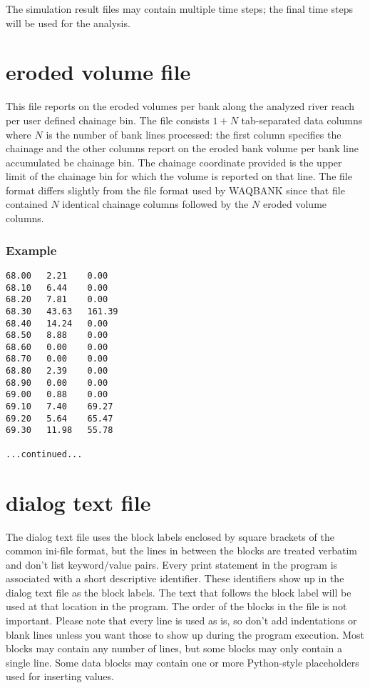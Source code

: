 The simulation result files may contain multiple time steps; the final time steps will be used for the analysis.


\section{eroded volume file}

This file reports on the eroded volumes per bank along the analyzed river reach per user defined chainage bin.
The file consists $1+N$ tab-separated data columns where $N$ is the number of bank lines processed: the first column specifies the chainage and the other columns report on the eroded bank volume per bank line accumulated be chainage bin.
The chainage coordinate provided is the upper limit of the chainage bin for which the volume is reported on that line.
The file format differs slightly from the file format used by WAQBANK since that file contained $N$ identical chainage columns followed by the $N$ eroded volume columns.

\subsubsection*{Example}

\begin{Verbatim}
68.00   2.21    0.00
68.10   6.44    0.00
68.20   7.81    0.00
68.30   43.63   161.39
68.40   14.24   0.00
68.50   8.88    0.00
68.60   0.00    0.00
68.70   0.00    0.00
68.80   2.39    0.00
68.90   0.00    0.00
69.00   0.88    0.00
69.10   7.40    69.27
69.20   5.64    65.47
69.30   11.98   55.78

...continued...
\end{Verbatim}

\section{dialog text file}

The dialog text file uses the block labels enclosed by square brackets of the common ini-file format, but the lines in between the blocks are treated verbatim and don't list keyword/value pairs.
Every print statement in the program is associated with a short descriptive identifier.
These identifiers show up in the dialog text file as the block labels.
The text that follows the block label will be used at that location in the program.
The order of the blocks in the file is not important.
Please note that every line is used as is, so don't add indentations or blank lines unless you want those to show up during the program execution.
Most blocks may contain any number of lines, but some blocks may only contain a single line.
Some data blocks may contain one or more Python-style placeholders used for inserting values.

